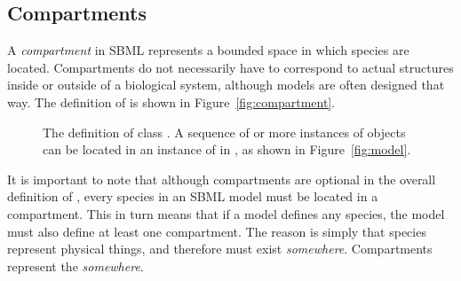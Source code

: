 \subsection{Compartments}
\label{sec:compartments}

A \emph{compartment} in SBML represents a bounded space in which
species are located.  Compartments do not necessarily have to
correspond to actual structures inside or outside of a biological
system, although models are often designed that way.  The definition
of \Compartment is shown in Figure~\vref{fig:compartment}.

\begin{figure}[htb]
  \centering
  \small
  \caption{The definition of class \Compartment.  A
      sequence of  or more instances of \Compartment objects
      can be located in an instance of \ListOfCompartments in
      \Model, as shown in Figure~\protect\ref{fig:model}.}
  \label{fig:compartment}
\end{figure}

It is important to note that although compartments are optional in
the overall definition of \Model, every species in an SBML model
must be located in a compartment.  This in turn means that if a
model defines any species, the model must also define at least one
compartment.  The reason is simply that species represent physical
things, and therefore must exist \emph{somewhere}.  Compartments
represent the \emph{somewhere}.


